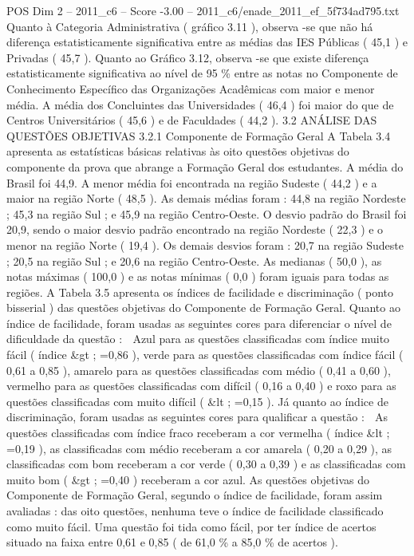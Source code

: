 \begin{textsample}{POS Dim 2 – 2011\_c6 – Score -3.00 – 2011\_c6/enade\_2011\_ef\_5f734ad795.txt}
Quanto à Categoria Administrativa ( gráfico 3.11 ), observa -se que não há diferença estatisticamente significativa entre as médias das IES Públicas ( 45,1 ) e Privadas ( 45,7 ).
Quanto ao Gráfico 3.12, observa -se que existe diferença estatisticamente significativa ao nível de 95 \% entre as notas no Componente de Conhecimento Específico das Organizações Acadêmicas com maior e menor média.
A média dos Concluintes das Universidades ( 46,4 ) foi maior do que de Centros Universitários ( 45,6 ) e de Faculdades ( 44,2 ). 3.2 ANÁLISE DAS QUESTÕES OBJETIVAS 3.2.1 Componente de Formação Geral A Tabela 3.4 apresenta as estatísticas básicas relativas às oito questões objetivas do componente da prova que abrange a Formação Geral dos estudantes.
A média do Brasil foi 44,9.
A menor média foi encontrada na região Sudeste ( 44,2 ) e a maior na região Norte ( 48,5 ).
As demais médias foram : 44,8 na região Nordeste ; 45,3 na região Sul ; e 45,9 na região Centro-Oeste.
O desvio padrão do Brasil foi 20,9, sendo o maior desvio padrão encontrado na região Nordeste ( 22,3 ) e o menor na região Norte ( 19,4 ).
Os demais desvios foram : 20,7 na região Sudeste ; 20,5 na região Sul ; e 20,6 na região Centro-Oeste.
As medianas ( 50,0 ), as notas máximas ( 100,0 ) e as notas mínimas ( 0,0 ) foram iguais para todas as regiões.
A Tabela 3.5 apresenta os índices de facilidade e discriminação ( ponto bisserial ) das questões objetivas do Componente de Formação Geral.
Quanto ao índice de facilidade, foram usadas as seguintes cores para diferenciar o nível de dificuldade da questão :  Azul para as questões classificadas com índice muito fácil ( índice \&gt ; =0,86 ), verde para as questões classificadas com índice fácil ( 0,61 a 0,85 ), amarelo para as questões classificadas com médio ( 0,41 a 0,60 ), vermelho para as questões classificadas com difícil ( 0,16 a 0,40 ) e roxo para as questões classificadas com muito difícil ( \&lt ; =0,15 ).
Já quanto ao índice de discriminação, foram usadas as seguintes cores para qualificar a questão :  As questões classificadas com índice fraco receberam a cor vermelha ( índice \&lt ; =0,19 ), as classificadas com médio receberam a cor amarela ( 0,20 a 0,29 ), as classificadas com bom receberam a cor verde ( 0,30 a 0,39 ) e as classificadas com muito bom ( \&gt ; =0,40 ) receberam a cor azul.
As questões objetivas do Componente de Formação Geral, segundo o índice de facilidade, foram assim avaliadas : das oito questões, nenhuma teve o índice de facilidade classificado como muito fácil.
Uma questão foi tida como fácil, por ter índice de acertos situado na faixa entre 0,61 e 0,85 ( de 61,0 \% a 85,0 \% de acertos ).

\end{textsample}
